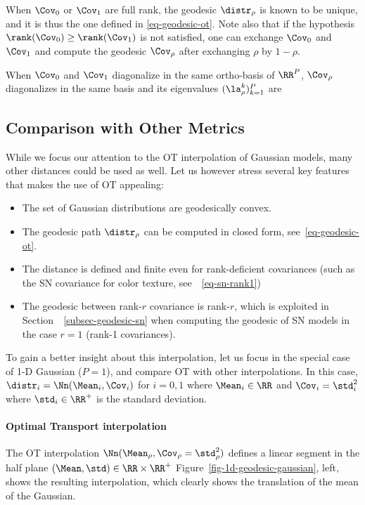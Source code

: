 When $\Cov_0$ or $\Cov_1$ are full rank, the geodesic $\distr_\rho$ is known to be unique, and it is thus the one defined in \eqref{eq-geodesic-ot}. Note also that if the hypothesis $\rank(\Cov_0) \geq \rank(\Cov_1)$ is not satisfied, one can exchange $\Cov_0$ and $\Cov_1$ and compute the geodesic $\Cov_\rho$ after exchanging $\rho$ by $1-\rho$.

When $\Cov_0$ and $\Cov_1$ diagonalize in the same ortho-basis of $\RR^P$, $\Cov_\rho$ diagonalizes in the same basis and its eigenvalues $(\la_\rho^k)_{k=1}^P$ are

\subsection{Comparison with Other Metrics}
\label{subsec-comparison-others}


While we focus our attention to the OT interpolation of Gaussian models, many other distances could be used as well. Let us however stress several key features that makes the use of OT appealing: 
\begin{itemize}
	\item The set of Gaussian distributions are geodesically convex. 
	\item The geodesic path $\distr_\rho$ can be computed in closed form, see~\eqref{eq-geodesic-ot}.
	\item The distance is defined and finite even for rank-deficient covariances (such as the SN covariance for color texture, see~~\eqref{eq-sn-rank1})
	\item The geodesic between rank-$r$ covariance is rank-$r$, which is exploited in Section~~\ref{subsec-geodesic-sn} when computing the geodesic of SN models in the case $r=1$ (rank-1 covariances). 
\end{itemize}

To gain a better insight about this interpolation, let us focus in the special case of 1-D Gaussian ($P=1$), and compare OT with other interpolations. In this case, $\distr_i = \Nn(\Mean_i,\Cov_i)$ for $i=0,1$ where $\Mean_i \in \RR$ and $\Cov_i = \std_i^2$ where $\std_i \in \RR^+$ is the standard deviation.


\paragraph{Optimal Transport interpolation}
The OT interpolation $\Nn(\Mean_\rho,\Cov_\rho=\std_\rho^2)$ defines a linear segment in the half plane $(\Mean,\std) \in \RR \times \RR^+$
Figure~\ref{fig-1d-geodesic-gaussian}, left, shows the resulting interpolation, which clearly shows the translation of the mean of the Gaussian.


